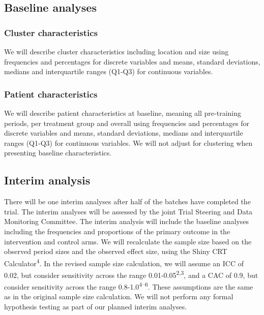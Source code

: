 \documentclass[
]{scrartcl}
\begin{document}
\hypertarget{baseline-analyses}{%
\subsection{Baseline analyses}\label{baseline-analyses}}

\hypertarget{cluster-characteristics}{%
\subsubsection{Cluster characteristics}\label{cluster-characteristics}}

We will describe cluster characteristics including location and size
using frequencies and percentages for discrete variables and means,
standard deviations, medians and interquartile ranges (Q1-Q3) for
continuous variables.

\hypertarget{patient-characteristics}{%
\subsubsection{Patient characteristics}\label{patient-characteristics}}

We will describe patient characteristics at baseline, meaning all
pre-training periods, per treatment group and overall using frequencies
and percentages for discrete variables and means, standard deviations,
medians and interquartile ranges (Q1-Q3) for continuous variables. We
will not adjust for clustering when presenting baseline characteristics.

\hypertarget{interim-analysis}{%
\subsection{Interim analysis}\label{interim-analysis}}

There will be one interim analyses after half of the batches have
completed the trial. The interim analyses will be assessed by the joint
Trial Steering and Data Monitoring Committee. The interim analysis will
include the baseline analyses including the frequencies and proportions
of the primary outcome in the intervention and control arms. We will
recalculate the sample size based on the observed period sizes and the
observed effect size, using the Shiny CRT Calculator\textsuperscript{4}.
In the revised sample size calculation, we will assume an ICC of 0.02,
but consider sensitivity across the range
0.01-0.05\textsuperscript{2,3}, and a CAC of 0.9, but consider
sensitivity across the range 0.8-1.0\textsuperscript{4--6}. These
assumptions are the same as in the original sample size calculation. We
will not perform any formal hypothesis testing as part of our planned
interim analyses.
\end{document}
